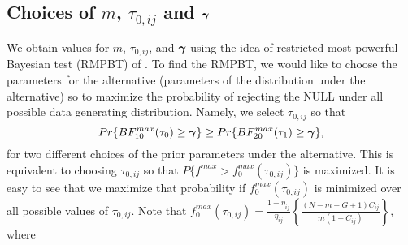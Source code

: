 \documentclass[12pt]{article}
\theoremstyle{plain}%
\theoremstyle{definition}
\newcommand{\ugamma}            {\mbox{\boldmath$\gamma$}}
\begin{document}
\subsection{Choices of $m$, $\tau_{0,ij}$ and $\ugamma$} \label{sec:testmtaugam}
We obtain values for $m$, $\tau_{0,ij}$, and $\ugamma$ using the idea of restricted most powerful Bayesian test (RMPBT) of \citealp{GoddardJohnson,Goddard}. To find the RMPBT, we would like to choose the parameters for the alternative (parameters of the distribution under the alternative) so to maximize the probability of rejecting the NULL under all possible data generating distribution. Namely, we select $\tau_{0,ij}$ so that
$$Pr\{BF^{max}_{10}(\tau_0) \geq  \ugamma\} \geq Pr\{BF^{max}_{20}(\tau_1) \geq \ugamma \},$$
for two different choices of the prior parameters under the alternative.
This is equivalent to choosing $\tau_{0,ij}$ so that  $P\{f^{max} > f^{max}_{0}(\tau_{0,ij})\}$ is maximized.
It is easy to see that we maximize that probability if $f^{max}_{0}(\tau_{0,ij})$ is minimized over all possible values of $\tau_{0,ij}$. Note that $f^{max}_{0}(\tau_{0,ij}) =\frac{1+\eta_{ij}}{\eta_{ij}} \left\{ \frac{(N - m -G+1)C_{ij}}{m(1 - C_{ij})} \right\}$, where
\end{document}
